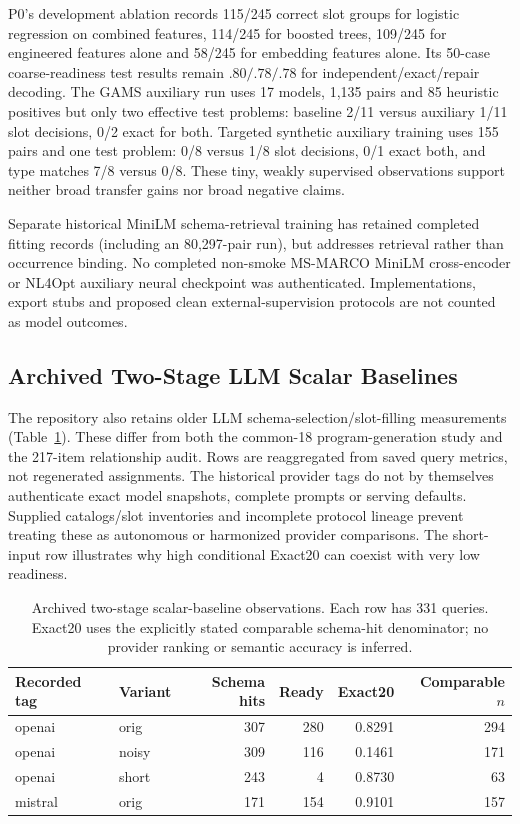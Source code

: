 P0's development ablation records 115/245 correct slot groups for logistic regression on combined features, 114/245 for boosted trees, 109/245 for engineered features alone and 58/245 for embedding features alone. Its 50-case coarse-readiness test results remain $.80/.78/.78$ for independent/exact/repair decoding. The GAMS auxiliary run uses 17 models, 1,135 pairs and 85 heuristic positives but only two effective test problems: baseline 2/11 versus auxiliary 1/11 slot decisions, 0/2 exact for both. Targeted synthetic auxiliary training uses 155 pairs and one test problem: 0/8 versus 1/8 slot decisions, 0/1 exact both, and type matches 7/8 versus 0/8. These tiny, weakly supervised observations support neither broad transfer gains nor broad negative claims.

Separate historical MiniLM schema-retrieval training has retained completed fitting records (including an 80,297-pair run), but addresses retrieval rather than occurrence binding. No completed non-smoke MS-MARCO MiniLM cross-encoder or NL4Opt auxiliary neural checkpoint was authenticated. Implementations, export stubs and proposed clean external-supervision protocols are not counted as model outcomes.

\subsection{Archived Two-Stage LLM Scalar Baselines}
The repository also retains older LLM schema-selection/slot-filling measurements (Table~\ref{tab:archived-scalar-llm}). These differ from both the common-18 program-generation study and the 217-item relationship audit. Rows are reaggregated from saved query metrics, not regenerated assignments. The historical provider tags do not by themselves authenticate exact model snapshots, complete prompts or serving defaults. Supplied catalogs/slot inventories and incomplete protocol lineage prevent treating these as autonomous or harmonized provider comparisons. The short-input row illustrates why high conditional Exact20 can coexist with very low readiness.

\begin{table}[htbp]\centering\small
\caption{Archived two-stage scalar-baseline observations. Each row has 331 queries. Exact20 uses the explicitly stated comparable schema-hit denominator; no provider ranking or semantic accuracy is inferred.}\label{tab:archived-scalar-llm}
\begin{tabular}{@{}llrrrr@{}}\toprule
Recorded tag & Variant & Schema hits & Ready & Exact20 & Comparable $n$\\\midrule
openai & orig & 307 & 280 & 0.8291 & 294\\
openai & noisy & 309 & 116 & 0.1461 & 171\\
openai & short & 243 & 4 & 0.8730 & 63\\
mistral & orig & 171 & 154 & 0.9101 & 157\\
\bottomrule\end{tabular}\end{table}


